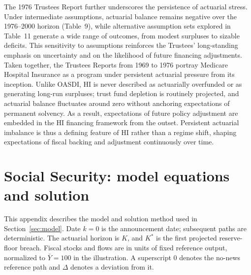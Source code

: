 \documentclass[12pt]{article}%
\theoremstyle{remark}
\begin{document}
The 1976 Trustees Report further underscores the persistence of actuarial stress. Under intermediate assumptions, actuarial balance remains negative over the 1976--2000 horizon (Table~9), while alternative assumption sets explored in Table~11 generate a wide range of outcomes, from modest surpluses to sizable deficits. This sensitivity to assumptions reinforces the Trustees’ long-standing emphasis on uncertainty and on the likelihood of future financing adjustments. Taken together, the Trustees Reports from 1969 to 1976 portray Medicare Hospital Insurance as a program under persistent actuarial pressure from its inception. Unlike OASDI, HI is never described as actuarially overfunded or as generating long-run surpluses; trust fund depletion is routinely projected, and actuarial balance fluctuates around zero without anchoring expectations of permanent solvency. As a result, expectations of future policy adjustment are embedded in the HI financing framework from the outset. Persistent actuarial imbalance is thus a defining feature of HI rather than a regime shift, shaping expectations of fiscal backing and adjustment continuously over time.

\FloatBarrier
\section{Social Security: model equations and solution}
\label{sec:app:model}
This appendix describes the model and solution method used in Section~\ref{sec:model}. Date $k=0$ is the announcement date; subsequent paths are deterministic. The actuarial horizon is $K$, and $K^*$ is the first projected reserve-floor breach. Fiscal stocks and flows are in units of fixed reference output, normalized to $\bar Y=100$ in the illustration. A superscript $0$ denotes the no-news reference path and $\Delta$ denotes a deviation from it.
\end{document}
